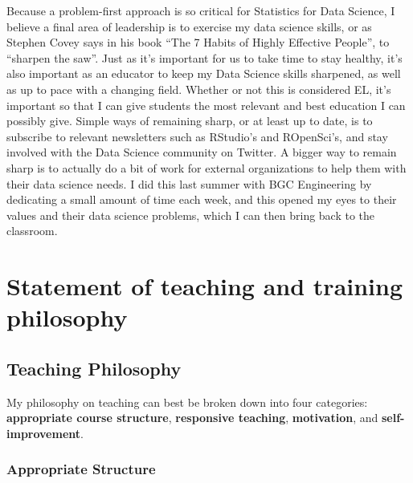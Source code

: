 \documentclass[]{article}
\begin{document}
Because a problem-first approach is so critical for Statistics for Data Science, I believe a final area of leadership is to exercise my data science skills, or as Stephen Covey says in his book ``The 7 Habits of Highly Effective People'', to ``sharpen the saw''. Just as it's important for us to take time to stay healthy, it's also important as an educator to keep my Data Science skills sharpened, as well as up to pace with a changing field. Whether or not this is considered EL, it's important so that I can give students the most relevant and best education I can possibly give. Simple ways of remaining sharp, or at least up to date, is to subscribe to relevant newsletters such as RStudio's and ROpenSci's, and stay involved with the Data Science community on Twitter. A bigger way to remain sharp is to actually do a bit of work for external organizations to help them with their data science needs. I did this last summer with BGC Engineering by dedicating a small amount of time each week, and this opened my eyes to their values and their data science problems, which I can then bring back to the classroom.

\hypertarget{statement-of-teaching-and-training-philosophy}{%
\section{Statement of teaching and training philosophy}\label{statement-of-teaching-and-training-philosophy}}

\hypertarget{teaching-philosophy}{%
\subsection{Teaching Philosophy}\label{teaching-philosophy}}

My philosophy on teaching can best be broken down into four categories: \textbf{appropriate course structure}, \textbf{responsive teaching}, \textbf{motivation}, and \textbf{self-improvement}.

\hypertarget{appropriate-structure}{%
\subsubsection{Appropriate Structure}\label{appropriate-structure}}
\end{document}

